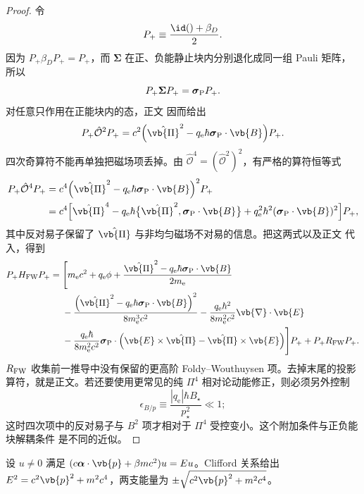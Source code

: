 \begin{proof}
令
\[
P_+\equiv\frac{\id()+\beta_D}{2}.
\]
因为 $P_+\beta_D P_+=P_+$，而 $\boldsymbol\Sigma$ 在正、负能静止块内分别退化成同一组 Pauli 矩阵，所以
\[
P_+\boldsymbol\Sigma P_+
=\boldsymbol\sigma_{\rm P}P_+.
\]
对任意只作用在正能块内的态，正文 因而给出
\[
P_+\hat{\mathcal O}^2P_+
=c^2\Bigl(
\hat{\vb{\Pi}}^2
-q_{\mathrm e}\hbar\boldsymbol\sigma_{\rm P}\cdot\vb{B}
\Bigr)P_+.
\]
四次奇算符不能再单独把磁场项丢掉。由 $\hat{\mathcal O}^4=(\hat{\mathcal O}^2)^2$，有严格的算符恒等式
\begin{align*}
P_+\hat{\mathcal O}^4P_+
={}&c^4
\Bigl(
\hat{\vb{\Pi}}^2
-q_{\mathrm e}\hbar\boldsymbol\sigma_{\rm P}\cdot\vb{B}
\Bigr)^2P_+\\
={}&c^4\Bigl[
\hat{\vb{\Pi}}^4
-q_{\mathrm e}\hbar\bigl\{
\hat{\vb{\Pi}}^2,
\boldsymbol\sigma_{\rm P}\cdot\vb{B}
\bigr\}
+q_{\mathrm e}^2\hbar^2
(\boldsymbol\sigma_{\rm P}\cdot\vb{B})^2
\Bigr]P_+,
\end{align*}
其中反对易子保留了 $\hat{\vb{\Pi}}$ 与非均匀磁场不对易的信息。把这两式以及正文 代入，得到
\begin{align*}
P_+H_{\rm FW}P_+
={}&\Biggl[
m_{\mathrm e} c^2+q_{\mathrm e}\phi
+\frac{\hat{\vb{\Pi}}^2-q_{\mathrm e}\hbar\boldsymbol\sigma_{\rm P}\cdot\vb{B}}{2m_{\mathrm e}}\\
&-\frac{\left(\hat{\vb{\Pi}}^2-q_{\mathrm e}\hbar\boldsymbol\sigma_{\rm P}\cdot\vb{B}\right)^2}{8m_{\mathrm e}^3c^2}
-\frac{q_{\mathrm e}\hbar^2}{8m_{\mathrm e}^2c^2}\vb{\nabla}\cdot\vb{E}\\
&-\frac{q_{\mathrm e}\hbar}{8m_{\mathrm e}^2c^2}
\boldsymbol\sigma_{\rm P}\cdot
\left(
\vb{E}\times\hat{\vb{\Pi}}
-\hat{\vb{\Pi}}\times\vb{E}
\right)
\Biggr]P_+ + P_+R_{\rm FW}P_+ .
\end{align*}
$R_{\rm FW}$ 收集前一推导中没有保留的更高阶 Foldy--Wouthuysen 项。去掉末尾的投影算符，就是正文。若还要使用更常见的纯 $\Pi^4$ 相对论动能修正，则必须另外控制
\[
\epsilon_{B/p}
\equiv
\frac{|q_{\mathrm e}|\hbar B_\star}{p_\star^2}\ll1;
\]
这时四次项中的反对易子与 $B^2$ 项才相对于 $\Pi^4$ 受控变小。这个附加条件与正负能块解耦条件 是不同的近似。
\end{proof}

\begin{proposition}
设 $u\ne0$ 满足 $(c\boldsymbol\alpha\cdot\vb{p}+\beta mc^2)u=Eu$。Clifford 关系给出 $E^2=c^2\vb{p}^2+m^2c^4$，两支能量为 $\pm\sqrt{c^2\vb{p}^2+m^2c^4}$。
\end{proposition}

